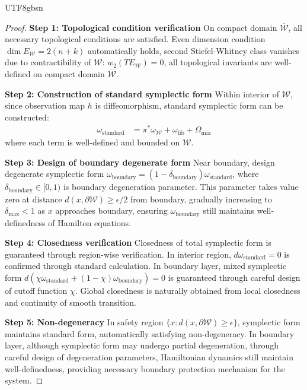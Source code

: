 \documentclass[a4paper,12pt]{extarticle}
\theoremstyle{definition}
\begin{document}
\begin{CJK}{UTF8}{gbsn}
\begin{proof}
\textbf{Step 1: Topological condition verification}
On compact domain $\overline{\mathcal{W}}$, all necessary topological conditions are satisfied. Even dimension condition $\dim E_{\mathcal{W}} = 2(n+k)$ automatically holds, second Stiefel-Whitney class vanishes due to contractibility of $\mathcal{W}$: $w_2(TE_{\mathcal{W}}) = 0$, all topological invariants are well-defined on compact domain $\overline{\mathcal{W}}$.

\textbf{Step 2: Construction of standard symplectic form}
Within interior of $\mathcal{W}$, since observation map $h$ is diffeomorphism, standard symplectic form can be constructed:
\begin{align*}
\omega_{\text{standard}} &= \pi^*\omega_{\mathcal{W}} + \omega_{\text{fib}} + \Omega_{\text{mix}}
\end{align*}
where each term is well-defined and bounded on $\mathcal{W}$.

\textbf{Step 3: Design of boundary degenerate form}
Near boundary, design degenerate symplectic form $\omega_{\text{boundary}} = (1-\delta_{\text{boundary}}) \omega_{\text{standard}}$, where $\delta_{\text{boundary}} \in [0,1)$ is boundary degeneration parameter. This parameter takes value zero at distance $d(x,\partial \mathcal{W}) \geq \epsilon/2$ from boundary, gradually increasing to $\delta_{\max} < 1$ as $x$ approaches boundary, ensuring $\omega_{\text{boundary}}$ still maintains well-definedness of Hamilton equations.

\textbf{Step 4: Closedness verification}
Closedness of total symplectic form is guaranteed through region-wise verification. In interior region, $d\omega_{\text{standard}} = 0$ is confirmed through standard calculation. In boundary layer, mixed symplectic form $d(\chi \omega_{\text{standard}} + (1-\chi)\omega_{\text{boundary}}) = 0$ is guaranteed through careful design of cutoff function $\chi$. Global closedness is naturally obtained from local closedness and continuity of smooth transition.

\textbf{Step 5: Non-degeneracy}
In safety region $\{x : d(x,\partial \mathcal{W}) \geq \epsilon\}$, symplectic form maintains standard form, automatically satisfying non-degeneracy. In boundary layer, although symplectic form may undergo partial degeneration, through careful design of degeneration parameters, Hamiltonian dynamics still maintain well-definedness, providing necessary boundary protection mechanism for the system.
\end{proof}


\end{CJK}
\end{document}
